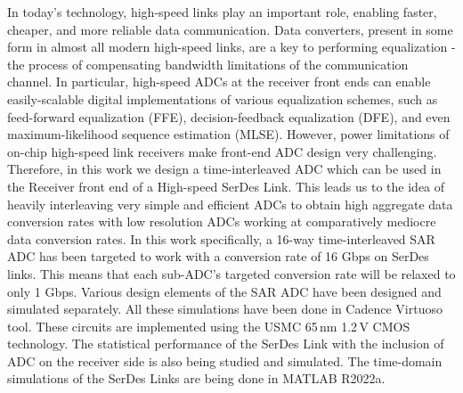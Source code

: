 
In today's technology, high-speed links play an important role, enabling 
faster, cheaper, and more reliable data communication. Data converters, present in some form in almost all modern high-speed links, are a key to performing equalization - the process of compensating bandwidth limitations of the communication channel. In particular, high-speed ADCs at the receiver front ends can enable easily-scalable digital implementations of various equalization schemes, such as feed-forward equalization (FFE), decision-feedback equalization (DFE), and even maximum-likelihood sequence estimation (MLSE). However, power limitations of on-chip high-speed link receivers make front-end ADC design very challenging. Therefore, in this work we design a time-interleaved ADC which can be used in the Receiver front end of a High-speed SerDes Link. This leads us to the idea of heavily interleaving very simple and efficient ADCs to obtain high aggregate data conversion rates with low resolution ADCs working at comparatively mediocre data conversion rates. In this work specifically, a 16-way time-interleaved SAR ADC has been targeted to work with a conversion rate of 16 Gbps on SerDes links. This means that each sub-ADC's targeted conversion rate will be relaxed to only 1 Gbps. Various design elements of the SAR ADC have been designed and simulated separately. All these simulations have been done in Cadence Virtuoso tool. These circuits are implemented using the USMC 65\,nm 1.2\,V CMOS technology. The statistical performance of the SerDes Link with the inclusion of ADC on the receiver side is also being studied and simulated. The time-domain simulations of the SerDes Links are being done in MATLAB R2022a.

\newpage
